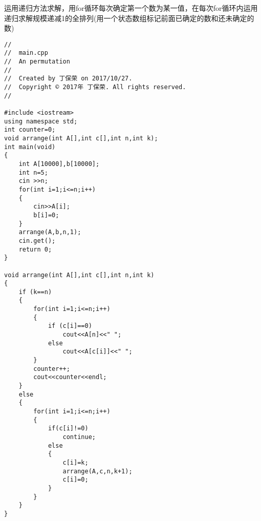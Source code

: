 \documentclass[11pt, a4paper, UTF8]{ctexart}
\begin{document}
\begin{solution}
运用递归方法求解，用for循环每次确定第一个数为某一值，在每次for循环内运用递归求解规模递减1的全排列(用一个状态数组标记前面已确定的数和还未确定的数)\\
\begin{lstlisting}
//
//  main.cpp
//  An permutation
//
//  Created by 丁保荣 on 2017/10/27.
//  Copyright © 2017年 丁保荣. All rights reserved.
//

#include <iostream>
using namespace std;
int counter=0;
void arrange(int A[],int c[],int n,int k);
int main(void)
{
    int A[10000],b[10000];
    int n=5;
    cin >>n;
    for(int i=1;i<=n;i++)
    {
        cin>>A[i];
        b[i]=0;
    }
    arrange(A,b,n,1);
    cin.get();
    return 0;
}

void arrange(int A[],int c[],int n,int k)
{
    if (k==n) 
    {
        for(int i=1;i<=n;i++)
        {
            if (c[i]==0)
                cout<<A[n]<<" ";
            else
                cout<<A[c[i]]<<" ";
        }
        counter++;
        cout<<counter<<endl;
    }
    else
    {
        for(int i=1;i<=n;i++)
        {
            if(c[i]!=0)
                continue; 
            else
            {
                c[i]=k;
                arrange(A,c,n,k+1);
                c[i]=0;
            }
        }
    }
}

\end{lstlisting}
\end{solution}
\end{document}
